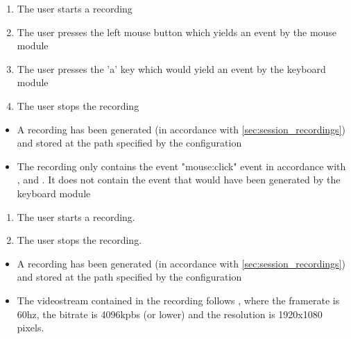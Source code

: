 \begin{tests}
    {\begin{enumerate}
        \item The \gls{user} starts a recording
        \item The \gls{user} presses the left mouse button which yields an \gls{event} by the mouse module
        \item The \gls{user} presses the 'a' key which would yield an \gls{event} by the keyboard module
        \item The \gls{user} stops the recording
    \end{enumerate}}
    {\begin{itemize}
        \item A recording has been generated (in accordance with \ref{sec:session_recordings}) and stored at the path specified by the configuration
        \item The recording only contains the \gls{event} "mouse:click" event in accordance with ,  and . It does not contain the \gls{event} that would have been generated by the keyboard module
    \end{itemize}}

    {\begin{enumerate}
        \item The \gls{user} starts a recording.
        \item The \gls{user} stops the recording.
    \end{enumerate}}
    {\begin{itemize}
        \item A recording has been generated (in accordance with \ref{sec:session_recordings}) and stored at the path specified by the configuration
        \item The videostream contained in the recording follows , where the framerate is 60hz, the bitrate is 4096kpbs (or lower) and the resolution is 1920x1080 pixels.
    \end{itemize}}


\end{tests}
